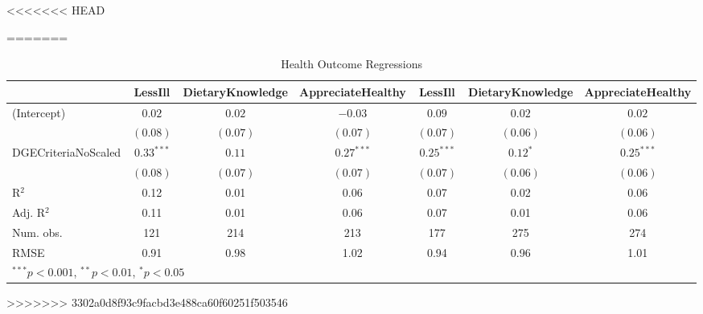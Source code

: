 \documentclass[12pt, a4paper, titlepage]{article}\usepackage[]{graphicx}\usepackage[]{color}
\makeatletter
\newenvironment{kframe}{%
 \def\at@end@of@kframe{}%
 \ifinner\ifhmode%
  \def\at@end@of@kframe{\end{minipage}}%
  \begin{minipage}{\columnwidth}%
 \fi\fi%
 \def\FrameCommand##1{\hskip\@totalleftmargin \hskip-\fboxsep
 \colorbox{shadecolor}{##1}\hskip-\fboxsep
     \hskip-\linewidth \hskip-\@totalleftmargin \hskip\columnwidth}%
 \MakeFramed {\advance\hsize-\width
   \@totalleftmargin\z@ \linewidth\hsize
   \@setminipage}}%
 {\par\unskip\endMakeFramed%
 \at@end@of@kframe}
\makeatother
\begin{document}
\begin{kframe}


{\ttfamily\noindent{}}

<<<<<<< HEAD
\begin{kframe}

=======
{\ttfamily\noindent\bfseries{}}\end{kframe}
\begin{table}
\begin{center}
\begin{tabular}{l c c c c c c }
\hline
 & LessIll & DietaryKnowledge & AppreciateHealthy & LessIll & DietaryKnowledge & AppreciateHealthy \\
\hline
(Intercept)         & $0.02$       & $0.02$   & $-0.03$      & $0.09$       & $0.02$     & $0.02$       \\
                    & $(0.08)$     & $(0.07)$ & $(0.07)$     & $(0.07)$     & $(0.06)$   & $(0.06)$     \\
DGECriteriaNoScaled & $0.33^{***}$ & $0.11$   & $0.27^{***}$ & $0.25^{***}$ & $0.12^{*}$ & $0.25^{***}$ \\
                    & $(0.08)$     & $(0.07)$ & $(0.07)$     & $(0.07)$     & $(0.06)$   & $(0.06)$     \\
\hline
R$^2$               & 0.12         & 0.01     & 0.06         & 0.07         & 0.02       & 0.06         \\
Adj. R$^2$          & 0.11         & 0.01     & 0.06         & 0.07         & 0.01       & 0.06         \\
Num. obs.           & 121          & 214      & 213          & 177          & 275        & 274          \\
RMSE                & 0.91         & 0.98     & 1.02         & 0.94         & 0.96       & 1.01         \\
\hline
\multicolumn{7}{l}{\scriptsize{$^{***}p<0.001$, $^{**}p<0.01$, $^*p<0.05$}}
\end{tabular}
\caption{Health Outcome Regressions}
\label{table:coefficients}
\end{center}
\end{table}


\begin{kframe}
>>>>>>> 3302a0d8f93c9facbd3e488ca60f60251f503546


\end{kframe}
\end{kframe}
\end{document}
